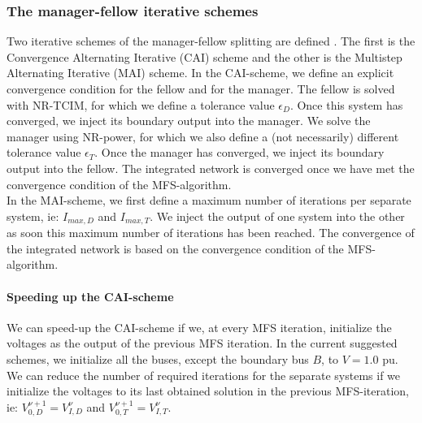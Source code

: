 \documentclass[10pt,journal]{article}
\begin{document}
\subsubsection{The manager-fellow iterative schemes}
Two iterative schemes of the manager-fellow splitting are defined \cite{Sun2005}. The first is the Convergence Alternating Iterative (CAI) scheme and the other is the Multistep Alternating Iterative (MAI) scheme. In the CAI-scheme, we define an explicit convergence condition for the fellow and for the manager. The fellow is solved with NR-TCIM, for which we define a tolerance value $\epsilon_D$. Once this system has converged, we inject its boundary output into the manager. We solve the manager using NR-power, for which we also define a (not necessarily) different tolerance value $\epsilon_T$. Once the manager has converged, we inject its boundary output into the fellow. The integrated network is converged once we have met the convergence condition of the MFS-algorithm. \\
In the MAI-scheme, we first define a maximum number of iterations per separate system, ie: $I_{max,D}$ and $I_{max,T}$. We inject the output of one system into the other as soon this maximum number of iterations has been reached. The convergence of the integrated network is based on the convergence condition of the MFS-algorithm. 
\paragraph{Speeding up the CAI-scheme} \label{par:caischeme}
We can speed-up the CAI-scheme if we, at every MFS iteration, initialize the voltages as the output of the previous MFS iteration. In the current suggested schemes, we initialize all the buses, except the boundary bus $B$, to $V=1.0$ pu. We can reduce the number of required iterations for the separate systems if we initialize the voltages to its last obtained solution in the previous MFS-iteration, ie: $V^{\nu+1}_{0,D}=V^{\nu}_{I,D}$ and $V^{\nu+1}_{0,T}=V^{\nu}_{I,T}$. 
\end{document}
